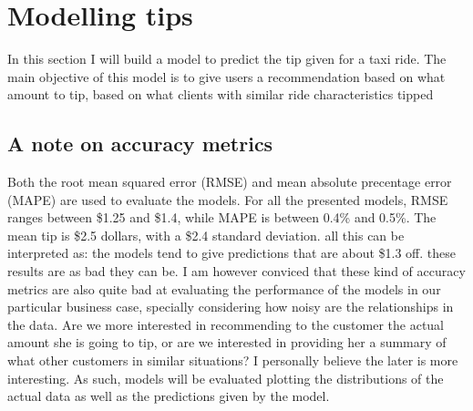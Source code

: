 \documentclass[11pt]{article}
\begin{document}
\section{Modelling tips}
\label{sec:orgb0bdedc}

In this section I will build a model to predict the tip given
for a taxi ride. The main objective of this model is to give
users a recommendation based on what amount to tip, based on
what clients with similar ride characteristics tipped

\subsection{A note on accuracy metrics}
\label{sec:org633cb90}
Both the root mean squared error (RMSE) and mean absolute precentage
error (MAPE) are used to evaluate the models.
For all the presented models, RMSE ranges between \$1.25 and \$1.4, while
MAPE is between 0.4\% and 0.5\%.
The mean tip is \$2.5 dollars, with a \$2.4 standard deviation. all this can
be interpreted as: the models tend to give predictions that are about \$1.3 off.
these results are as bad they can be. I am however conviced that these kind of
accuracy metrics are also quite bad at evaluating the performance of
the models in our particular business case, specially considering how noisy
are the relationships in the data.
Are we more interested in recommending to the customer the actual amount
she is going to tip, or are we interested in providing her a summary of what
other customers in similar situations? I personally believe the later is more
interesting. As such, models will be evaluated plotting the distributions of the
actual data as well as the predictions given by the model.
\end{document}
